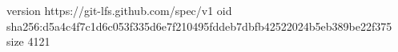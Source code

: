 version https://git-lfs.github.com/spec/v1
oid sha256:d5a4c4f7c1d6c053f335d6e7f210495fddeb7dbfb42522024b5eb389be22f375
size 4121
